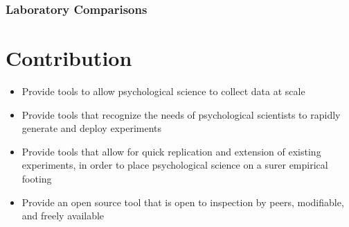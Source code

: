 \documentclass[12pt,a4paper,titlepage]{scrreprt}
\begin{document}
\subsection{Laboratory Comparisons}
\chapter{Contribution}
\begin{itemize}
\item Provide tools to allow psychological science to collect data at scale
\item Provide tools that recognize the needs of psychological scientists to rapidly generate and deploy experiments
\item Provide tools that allow for quick replication and extension of existing experiments, in order to place psychological science on a surer empirical footing
\item Provide an open source tool that is open to inspection by peers, modifiable, and freely available
\end{itemize}
      
    \nocite{*}
    
    {}
\end{document}

